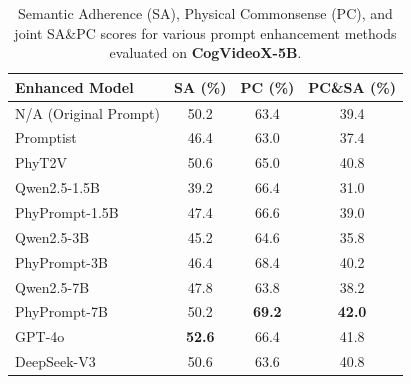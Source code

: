 \begin{table}[ht]
  \centering
  \caption{Semantic Adherence (SA), Physical Commonsense (PC), and joint SA\&PC scores for various prompt enhancement methods evaluated on \textbf{CogVideoX-5B}.}
  \setlength{\tabcolsep}{3pt}
  \label{tab:enhanced_cv5b}
  \begin{tabular}{lccc}
    \toprule
    \textbf{Enhanced Model}   & \textbf{SA (\%)} & \textbf{PC (\%)} & \textbf{PC\&SA (\%)} \\
    \midrule
    N/A (Original Prompt)     & 50.2             & 63.4             & 39.4                   \\
    Promptist                 & 46.4             & 63.0             & 37.4                   \\
    PhyT2V                    & 50.6             & 65.0             & 40.8                   \\
    \midrule
    Qwen2.5-1.5B              & 39.2             & 66.4             & 31.0                   \\
    PhyPrompt-1.5B            & 47.4             & 66.6             & 39.0                   \\
    Qwen2.5-3B                & 45.2             & 64.6             & 35.8                   \\
    PhyPrompt-3B              & 46.4             & 68.4             & 40.2                   \\
    Qwen2.5-7B                & 47.8             & 63.8             & 38.2                   \\
    PhyPrompt-7B              & 50.2             & \textbf{69.2}             & \textbf{42.0}                  \\
    \midrule
    GPT-4o                    & \textbf{52.6}             & 66.4             & 41.8                   \\
    DeepSeek-V3               & 50.6             & 63.6             & 40.8                   \\
    \bottomrule
  \end{tabular}
\end{table}


